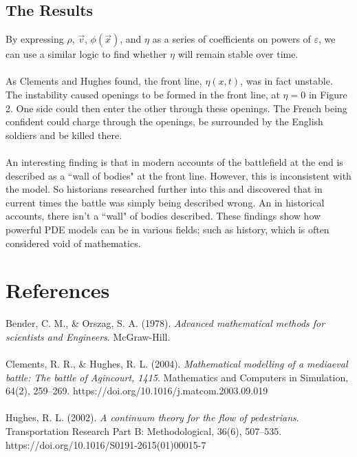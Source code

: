 \documentclass{article}
\begin{document}
\subsection{The Results}
By expressing $\rho$, $\vec v$, $\phi(\vec x)$, and $\eta$ as a series of coefficients on powers of $\varepsilon$, we can use a similar logic to find whether $\eta$ will remain stable over time. \\
\\
As Clements and Hughes found, the front line, $\eta(x,t)$, was in fact unstable. The instability caused openings to be formed in the front line, at $\eta=0$ in Figure 2. One side could then enter the other through these openings. The French being confident could charge through the openings, be surrounded by the English soldiers and be killed there. \\
\\
An interesting finding is that in modern accounts of the battlefield at the end is described as a ``wall of bodies" at the front line. However, this is inconsistent with the model. So historians researched further into this and discovered that in current times the battle was simply being described wrong. An in historical accounts, there isn't a ``wall" of bodies described. These findings show how powerful PDE models can be in various fields; such as history, which is often considered void of mathematics.

\section{References}
Bender, C. M., \& Orszag, S. A. (1978). \emph{Advanced mathematical methods for scientists and Engineers}. McGraw-Hill. 
\\\\
Clements, R. R., \& Hughes, R. L. (2004). \emph{Mathematical modelling of a mediaeval battle: The battle of Agincourt, 1415}. Mathematics and Computers in Simulation, 64(2), 259–269. https://doi.org/10.1016/j.matcom.2003.09.019 \\
\\
Hughes, R. L. (2002). \emph{A continuum theory for the flow of pedestrians}. Transportation Research Part B: Methodological, 36(6), 507–535. https://doi.org/10.1016/S0191-2615(01)00015-7 
\end{document}
